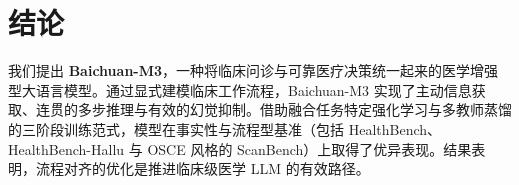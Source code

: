 \section{结论}

我们提出 \textbf{Baichuan-M3}，一种将临床问诊与可靠医疗决策统一起来的医学增强型大语言模型。通过显式建模临床工作流程，Baichuan-M3 实现了主动信息获取、连贯的多步推理与有效的幻觉抑制。借助融合任务特定强化学习与多教师蒸馏的三阶段训练范式，模型在事实性与流程型基准（包括 HealthBench、HealthBench-Hallu 与 OSCE 风格的 ScanBench）上取得了优异表现。结果表明，流程对齐的优化是推进临床级医学 LLM 的有效路径。
